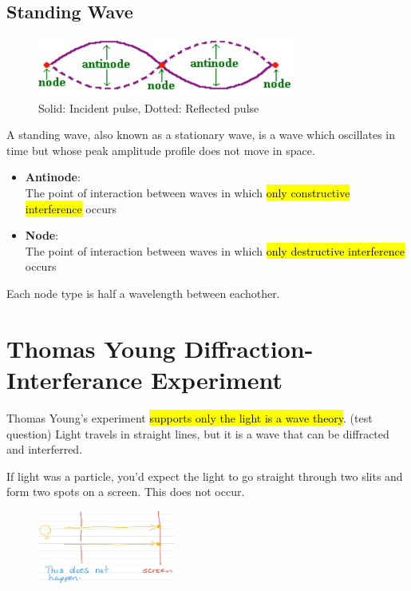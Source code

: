 \documentclass[a4paper,12pt]{article}
\begin{document}
\subsection{Standing Wave}
\begin{figure}[H]
    \centering
    \includegraphics[width=0.75\textwidth]{standing-wave}
    \caption{Solid: Incident pulse, Dotted: Reflected pulse}
\end{figure}
A standing wave, also known as a stationary wave, is a wave which oscillates in time but whose peak amplitude profile does not move in space.

\begin{itemize}
    \item{\textbf{Antinode}: \\The point of interaction between waves in which \hl{only constructive interference} occurs}
    \item{\textbf{Node}: \\The point of interaction between waves in which \hl{only destructive interference} occurs}
\end{itemize}

Each node type is half a wavelength between eachother.

\section{Thomas Young Diffraction-Interferance Experiment}
Thomas Young's experiment \hl{supports only the light is a wave theory}. (test question) Light travels in straight lines, but it is a wave that can be diffracted and interferred.

If light was a particle, you'd expect the light to go straight through two slits and form two spots on a screen. This does not occur.
\begin{figure}[H]
    \centering
    \includegraphics[width=0.4\textwidth]{experiment-1}
\end{figure}
\end{document}
